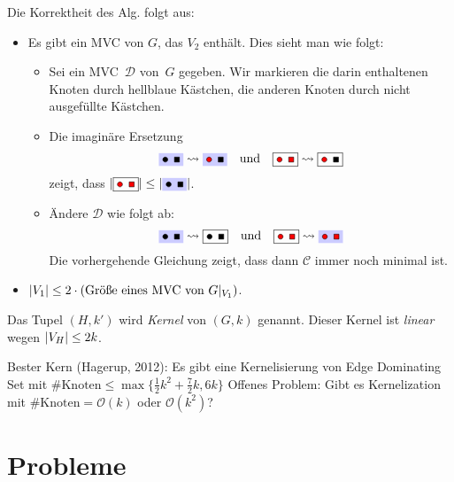 \documentclass{cheat-sheet}
\newcommand{\size}[1]{\abs{#1}} %
\renewcommand{\O}{\mathcal{O}} %
\newcommand{\KCircleUnsel}{\tikz{\draw [fill=black] (0,0) circle (2pt);}}
\newcommand{\KSquareUnsel}{\tikz{\draw [fill=black] (0,0) rectangle (4pt, 4pt);}}
\newcommand{\KCircleSel}{\tikz{\draw [fill=red] (0,0) circle (2pt);}}
\newcommand{\KSquareSel}{\tikz{\draw [fill=red] (0,0) rectangle (4pt, 4pt);}}
\begin{document}
Die Korrektheit des Alg. folgt aus:
\begin{itemize}
  \item Es gibt ein MVC von $G$, das $V_2$ enthält. Dies sieht man wie folgt:
    \begin{itemize}
      \item Sei ein MVC~$\mathcal{D}$ von~$G$ gegeben. Wir markieren die darin enthaltenen Knoten durch hellblaue Kästchen, die anderen Knoten durch nicht ausgefüllte Kästchen.
      \item Die imaginäre Ersetzung
        \[
          \colorbox{blue!20}{\KCircleUnsel \enspace \KSquareUnsel} \rightsquigarrow \colorbox{blue!20}{\KCircleSel \enspace \KSquareUnsel}
          \quad \text{und} \quad
          \framebox{\KCircleSel \enspace \KSquareSel} \rightsquigarrow \framebox{\KCircleSel \enspace \KSquareUnsel}
        \]
        zeigt, dass $\size{\framebox{\KCircleSel \enspace \KSquareSel}} \leq \size{\colorbox{blue!20}{\KCircleUnsel \enspace \KSquareUnsel}}$.
      \item
        Ändere $\mathcal{D}$ wie folgt ab:
        \[
          \colorbox{blue!20}{\KCircleUnsel \enspace \KSquareUnsel} \rightsquigarrow \framebox{\KCircleUnsel \enspace \KSquareUnsel}
          \quad \text{und} \quad
          \framebox{\KCircleSel \enspace \KSquareSel} \rightsquigarrow \colorbox{blue!20}{\KCircleSel \enspace \KSquareSel}
        \]
        Die vorhergehende Gleichung zeigt, dass dann $\mathcal{C}$ immer noch minimal ist.
    \end{itemize}
  \item $\size{V_1} \leq 2 \cdot (\text{Größe eines MVC von $G|_{V_1}$})$.
\end{itemize}

\begin{bem}
  Das Tupel $(H, k')$ wird \textit{Kernel} von $(G, k)$ genannt.
  Dieser Kernel ist \textit{linear} wegen $\size{V_H} \leq 2 k$.
\end{bem}

Bester Kern (Hagerup, 2012): Es gibt eine Kernelisierung von Edge Dominating Set mit $\#\text{Knoten} \leq \max \{ \tfrac{1}{2} k^2 + \tfrac{7}{2} k, 6 k \}$
Offenes Problem: Gibt es Kernelization mit $\#\text{Knoten} = \O(k)$ oder $\O(k^2)$?

\section{Probleme}
\end{document}
